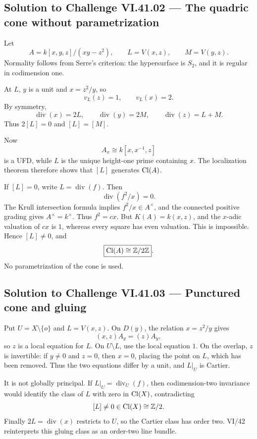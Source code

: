 \subsection*{Solution to Challenge VI.41.02 — The quadric cone without parametrization}
\begin{solution}
Let
\[
A=k[x,y,z]/(xy-z^2),\qquad L=V(x,z),\qquad M=V(y,z).
\]
Normality follows from Serre's criterion: the hypersurface is \(S_2\), and it is
regular in codimension one.

At \(L\), \(y\) is a unit and \(x=z^2/y\), so
\[
v_L(z)=1,\qquad v_L(x)=2.
\]
By symmetry,
\[
\operatorname{div}(x)=2L,\qquad
\operatorname{div}(y)=2M,\qquad
\operatorname{div}(z)=L+M.
\]
Thus \(2[L]=0\) and \([L]=[M]\).

Now
\[
A_x\cong k[x,x^{-1},z]
\]
is a UFD, while \(L\) is the unique height-one prime containing \(x\). The
localization theorem therefore shows that \([L]\) generates \(\operatorname{Cl}(A)\).

If \([L]=0\), write \(L=\operatorname{div}(f)\). Then
\[
\operatorname{div}(f^2/x)=0.
\]
The Krull intersection formula implies \(f^2/x\in A^\times\), and the connected
positive grading gives \(A^\times=k^\times\). Thus \(f^2=cx\). But
\(K(A)=k(x,z)\), and the \(x\)-adic valuation of \(cx\) is \(1\), whereas every
square has even valuation. This is impossible. Hence \([L]\ne0\), and
\[
\boxed{\operatorname{Cl}(A)\cong\mathbb Z/2\mathbb Z}.
\]
No parametrization of the cone is used.
\end{solution}

\subsection*{Solution to Challenge VI.41.03 — Punctured cone and gluing}
\begin{solution}
Put \(U=X\setminus\{o\}\) and \(L=V(x,z)\). On \(D(y)\), the relation
\(x=z^2/y\) gives
\[
(x,z)A_y=(z)A_y,
\]
so \(z\) is a local equation for \(L\). On \(U\setminus L\), use the local
equation \(1\). On the overlap, \(z\) is invertible: if \(y\ne0\) and \(z=0\),
then \(x=0\), placing the point on \(L\), which has been removed. Thus the two
equations differ by a unit, and \(L|_U\) is Cartier.

It is not globally principal. If \(L|_U=\operatorname{div}_U(f)\), then
codimension-two invariance would identify the class of \(L\) with zero in
\(\operatorname{Cl}(X)\), contradicting
\[
[L]\ne0\in\operatorname{Cl}(X)\cong\mathbb Z/2.
\]
Finally \(2L=\operatorname{div}(x)\) restricts to \(U\), so the Cartier class has
order two. VI/42 reinterprets this gluing class as an order-two line bundle.
\end{solution}

